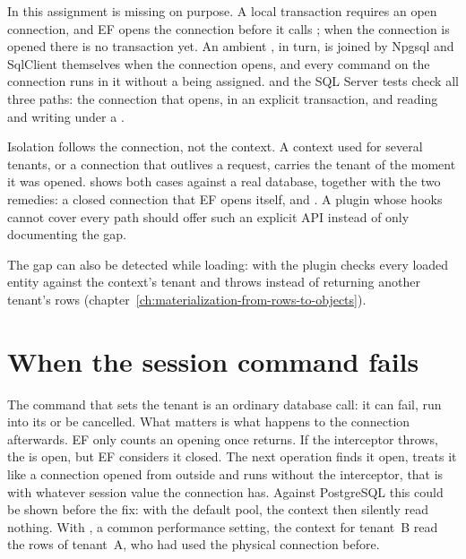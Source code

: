 In  this assignment is missing on purpose. A local
transaction requires an open connection, and EF opens the connection before it calls
; when the connection is opened there is no transaction yet.
An ambient , in turn, is joined by Npgsql and SqlClient
themselves when the connection opens, and every command on the connection runs in it without a
 being assigned. 
and the SQL Server tests check all three paths: the connection that
 opens,
 in an explicit transaction, and reading and
writing under a .

\begin{important}
  Isolation follows the connection, not the context. A context used for several tenants, or
  a connection that outlives a request, carries the tenant of the moment it was opened.
   shows both cases against a real
  database, together with the two remedies: a closed connection that EF opens itself, and
  . A plugin whose hooks
  cannot cover every path should offer such an explicit API instead of only documenting the
  gap.
\end{important}

The gap can also be detected while loading: with
 the plugin checks
every loaded entity against the context's tenant and throws instead of returning another
tenant's rows (chapter~\ref{ch:materialization-from-rows-to-objects}).

\section{When the session command fails}

The command that sets the tenant is an ordinary database call: it can fail, run into its
 or be cancelled. What matters is what happens to the
connection afterwards. EF only counts an opening once 
returns. If the interceptor throws, the  is open, but EF
considers it closed. The next operation finds it open, treats it like a connection opened from
outside and runs without the interceptor, that is with whatever session value the connection
has. Against PostgreSQL this could be shown before the fix: with the default pool, the context
then silently read nothing. With , a common performance setting, the
context for tenant~B read the rows of tenant~A, who had used the physical connection before.

